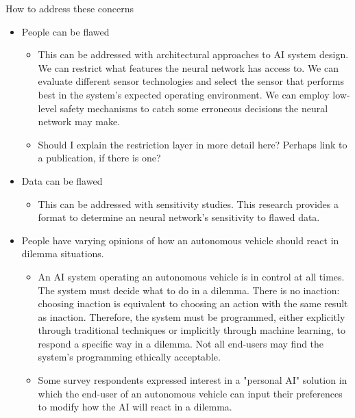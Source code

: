 \documentclass[]{report}
\begin{document}
How to address these concerns
\begin{itemize}
    \item People can be flawed
    \begin{itemize}
        \item This can be addressed with architectural approaches to AI system design. We can
        restrict what features the neural network has access to. We can evaluate different sensor
        technologies and select the sensor that performs best in the system's expected operating
        environment. We can employ low-level safety mechanisms to catch some erroneous decisions the
        neural network may make.
        \item Should I explain the restriction layer in more detail here? Perhaps link to a
        publication, if there is one?
    \end{itemize}
    
    \item Data can be flawed
    \begin{itemize}
        \item This can be addressed with sensitivity studies. This research provides a format to
        determine an neural network's sensitivity to flawed data.
    \end{itemize}

    \item People have varying opinions of how an autonomous vehicle should react in dilemma
    situations.
    \begin{itemize}
        \item An AI system operating an autonomous vehicle is in control at all times. The system
        must decide what to do in a dilemma. There is no inaction: choosing inaction is equivalent
        to choosing an action with the same result as inaction. Therefore, the system must be
        programmed, either explicitly through traditional techniques or implicitly through machine
        learning, to respond a specific way in a dilemma. Not all end-users may find the system's
        programming ethically acceptable.

        \item Some survey respondents expressed interest in a "personal AI" solution in which the
        end-user of an autonomous vehicle can input their preferences to modify how the AI will
        react in a dilemma.
        

\end{itemize}
\end{itemize}
\end{document}
